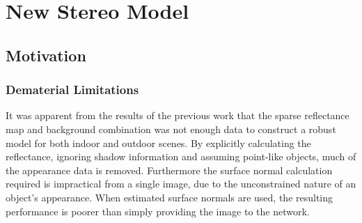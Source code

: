 \documentclass[ %
                    author={Gavin Parker},
                supervisor={Dr. Neill Campbell},
                    degree={MEng},
                     title={Deep Siamese Networks for Illumination Estimation from Stereo Images},
                  subtitle={},
                      type={research},
                      year={2018} ]{dissertation}
\begin{document}
\chapter{New Stereo Model}
\section{Motivation}
\subsection{Dematerial Limitations}
It was apparent from the results of the previous work that the sparse reflectance map and background combination was not enough data to construct a robust model for both indoor and outdoor scenes. By explicitly calculating the reflectance, ignoring shadow information and assuming point-like objects, much of the appearance data is removed. Furthermore the surface normal calculation required is impractical from a single image, due to the unconstrained nature of an object's appearance. When estimated surface normals are used, the resulting performance is poorer than simply providing the image to the network.
\end{document}
